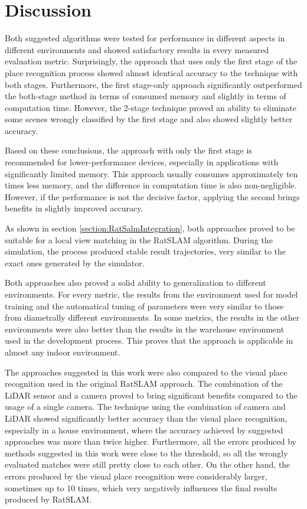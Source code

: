 \section{Discussion}\label{section:Discussion}

Both suggested algorithms were tested for performance in different aspects in different environments and showed satisfactory results in every measured evaluation metric. Surprisingly, the approach that uses only the first stage of the place recognition process showed almost identical accuracy to the technique with both stages. Furthermore, the first stage-only approach significantly outperformed the both-stage method in terms of consumed memory and slightly in terms of computation time. However, the 2-stage technique proved an ability to eliminate some scenes wrongly classified by the first stage and also showed slightly better accuracy.\par
Based on these conclusions, the approach with only the first stage is recommended for lower-performance devices, especially in applications with significantly limited memory. This approach usually consumes approximately ten times less memory, and the difference in computation time is also non-negligible. However, if the performance is not the decisive factor, applying the second brings benefits in slightly improved accuracy.\par
As shown in section \ref{section:RatSalmIntegration}, both approaches proved to be suitable for a local view matching in the RatSLAM algorithm. During the simulation, the process produced stable result trajectories, very similar to the exact ones generated by the simulator.\par
Both approaches also proved a solid ability to generalization to different environments. For every metric, the results from the environment used for model training and the automatical tuning of parameters were very similar to those from diametrally different environments. In some metrics, the results in the other environments were also better than the results in the warehouse environment used in the development process. This proves that the approach is applicable in almost any indoor environment.\par
The approaches suggested in this work were also compared to the visual place recognition used in the original RatSLAM approach. The combination of the LiDAR sensor and a camera proved to bring significant benefits compared to the usage of a single camera. The technique using the combination of camera and LiDAR showed significantly better accuracy than the visual place recognition, especially in a house environment, where the accuracy achieved by suggested approaches was more than twice higher. Furthermore, all the errors produced by methods suggested in this work were close to the threshold, so all the wrongly evaluated matches were still pretty close to each other. On the other hand, the errors produced by the visual place recognition were considerably larger, sometimes up to 10 times, which very negatively influences the final results produced by RatSLAM.\par
